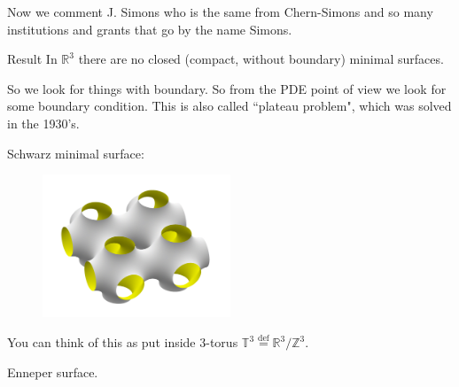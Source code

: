 Now we comment J. Simons who is the same from Chern-Simons and so many institutions and grants that go by the name Simons.


\begin{thing6}{Result}\leavevmode
In \(\mathbb{R}^3\) there are no closed (compact, without boundary) minimal surfaces.
\end{thing6}

So we look for things with boundary. So from the PDE point of view we look for some boundary condition. This is also called ``plateau problem", which was solved in the 1930's.

\begin{example}\leavevmode
Schwarz minimal surface:
\begin{figure}[H]
	\centering
	\includegraphics[width=0.5\textwidth]{fig1}
\end{figure}
You can think of this as put inside 3-torus \(\mathbb{T}^3\overset{\operatorname{def}}{=}\mathbb{R}^3/\mathbb{Z}^3\).
\end{example}

\begin{example}\leavevmode
Enneper surface.

\end{example}

